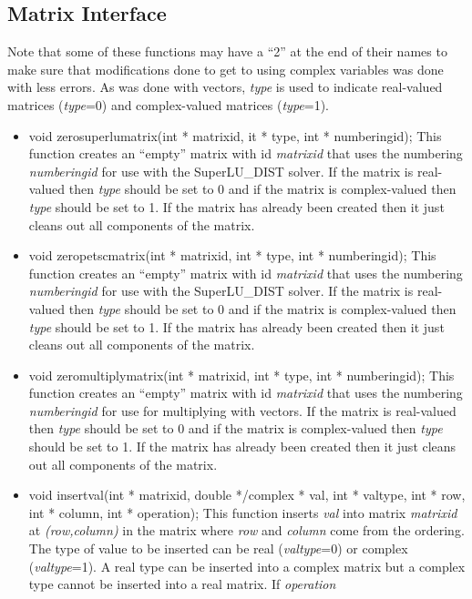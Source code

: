 \subsection{Matrix Interface}
Note that some of these functions may have a ``2'' at the end of their names to make sure
that modifications done to get to using complex variables was done with less errors. As was done with
vectors, \textit{type} is used to indicate real-valued matrices (\textit{type}=0) and complex-valued
matrices (\textit{type}=1).
\begin{itemize}
\item  void zerosuperlumatrix(int * matrixid, it * type, int * numberingid);  This function creates
an ``empty'' matrix with id \textit{matrixid} that uses the numbering \textit{numberingid}
for use with the SuperLU\_DIST solver.  If the matrix is real-valued then \textit{type}
should be set to 0 and if the matrix is complex-valued then \textit{type} should be set to 1. 
If the matrix has already been created then it just cleans out all components of the matrix.
\item  void zeropetscmatrix(int * matrixid, int * type, int * numberingid); This function creates
an ``empty'' matrix with id \textit{matrixid} that uses the numbering \textit{numberingid}
for use with the SuperLU\_DIST solver.  If the matrix is real-valued then \textit{type}
should be set to 0 and if the matrix is complex-valued then \textit{type} should be set to 1. 
If the matrix has already been created then it just cleans out all components of the matrix.
 \item void zeromultiplymatrix(int * matrixid, int * type, int * numberingid); This function creates
an ``empty'' matrix with id \textit{matrixid} that uses the numbering \textit{numberingid}
for use for multiplying with vectors.  If the matrix is real-valued then \textit{type}
should be set to 0 and if the matrix is complex-valued then \textit{type} should be set to 1. 
If the matrix has already been created then it just cleans out all components of the matrix.
\item  void insertval(int * matrixid, double */complex * val, int * valtype, int * row, 
		   int * column, int * operation);  This function inserts \textit{val} into
matrix \textit{matrixid} at \textit{(row,column)} in the matrix where \textit{row}
and \textit{column} come from the ordering.  The type of value to
 be inserted can be real (\textit{valtype}=0)
or complex (\textit{valtype}=1).  A real type can be inserted into a complex matrix but
a complex type cannot be inserted into a real matrix.  If \textit{operation}

\end{itemize}
